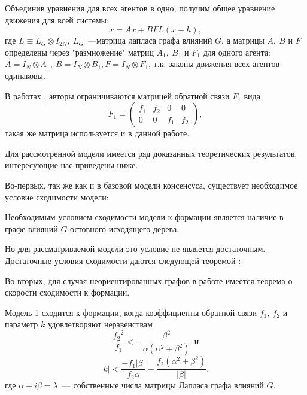Объединив уравнения для всех агентов в одно, получим общее уравнение движения для всей системы:
\begin{equation}
\dot{x}=Ax+BFL(x-h),
\label{eq:linear-motion}
\end{equation}
где $L\equiv L_G\otimes I_{2N},\ L_G$~---матрица лапласа графа влияний $G$, а матрицы $A,\ B$ и $F$ определены через "размножение" матриц $A_1,\ B_1$ и $F_1$ для одного агента: $A=I_N\otimes A_1,\ B=I_N\otimes B_1, F=I_N\otimes F_1$, т.к. законы движения всех агентов одинаковы.

В работах \cite{veerman2005flocks}, \cite{lafferriere2005decentralized} авторы ограничиваются матрицей обратной связи $F_1$ вида 
$$F_1=\left( \begin{array}{cccc}
f_1 & f_2 & 0 & 0 \\
0 & 0 & f_1 & f_2 \end{array} \right),$$ такая же матрица используется и в данной работе.

Для рассмотренной модели имеется ряд доказанных теоретических результатов, интересующие нас приведены ниже. 

Во-первых, так же как и в базовой модели консенсуса, существует необходимое условие сходимости модели:
\begin{proposition}
Необходимым условием сходимости модели к формации является наличие в графе влияний $G$ остовного исходящего дерева.
\end{proposition}

Но для рассматриваемой модели это условие не является достаточным. Достаточные условия сходимости даются следующей теоремой \cite{veerman2005flocks,lafferriere2005decentralized}:

Во-вторых, для случая неориентированных графов в работе \cite{lafferriere2005decentralized} имеется теорема о скорости сходимости к формации.
\begin{theorem}
Модель 1 сходится к формации, когда коэффициенты обратной связи $f_1,\ f_2$ и параметр $k$ удовлетворяют неравенствам 
\begin{equation}
\frac{{f_2}^2}{f_1}< -\frac{\beta^2}{\alpha(\alpha^2+\beta^2)}\ \ \text{и}
\end{equation}
\begin{equation}
|k|<\frac{-f_1|\beta|}{f_2\alpha}-\frac{f_2(\alpha^2+\beta^2)}{|\beta|},
\end{equation}
где $\alpha+i\beta=\lambda$~--- собственные числа матрицы Лапласа графа влияний $G$.
\end{theorem}

